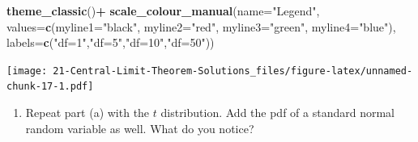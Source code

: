 \documentclass[
]{book}
\newenvironment{Shaded}{\begin{snugshade}}{\end{snugshade}}
\newcommand{\DataTypeTok}[1]{\textcolor[rgb]{0.13,0.29,0.53}{#1}}
\newcommand{\DecValTok}[1]{\textcolor[rgb]{0.00,0.00,0.81}{#1}}
\newcommand{\FloatTok}[1]{\textcolor[rgb]{0.00,0.00,0.81}{#1}}
\newcommand{\KeywordTok}[1]{\textcolor[rgb]{0.13,0.29,0.53}{\textbf{#1}}}
\newcommand{\NormalTok}[1]{#1}
\newcommand{\OperatorTok}[1]{\textcolor[rgb]{0.81,0.36,0.00}{\textbf{#1}}}
\newcommand{\StringTok}[1]{\textcolor[rgb]{0.31,0.60,0.02}{#1}}
\providecommand{\tightlist}{%
  \setlength{\itemsep}{0pt}\setlength{\parskip}{0pt}}
\begin{document}
\begin{Shaded}
\begin{Highlighting}[]
\StringTok{   }\KeywordTok{theme_classic}\NormalTok{()}\OperatorTok{+}
\KeywordTok{scale_colour_manual}\NormalTok{(}\DataTypeTok{name=}\StringTok{"Legend"}\NormalTok{,}
    \DataTypeTok{values=}\KeywordTok{c}\NormalTok{(}\DataTypeTok{myline1=}\StringTok{"black"}\NormalTok{, }
             \DataTypeTok{myline2=}\StringTok{"red"}\NormalTok{,}
             \DataTypeTok{myline3=}\StringTok{"green"}\NormalTok{,}
             \DataTypeTok{myline4=}\StringTok{"blue"}\NormalTok{),}
    \DataTypeTok{labels=}\KeywordTok{c}\NormalTok{(}\StringTok{"df=1"}\NormalTok{,}\StringTok{"df=5"}\NormalTok{,}\StringTok{"df=10"}\NormalTok{,}\StringTok{"df=50"}\NormalTok{))}
\end{Highlighting}
\end{Shaded}

\texttt{[image: 21-Central-Limit-Theorem-Solutions\_files/figure-latex/unnamed-chunk-17-1.pdf]}

\begin{enumerate}
\def\labelenumi{\alph{enumi}.}
\setcounter{enumi}{1}
\tightlist
\item
  Repeat part (a) with the \(t\) distribution. Add the pdf of a standard normal random variable as well. What do you notice?
\end{enumerate}

\begin{Shaded}
\end{Shaded}
\end{document}
